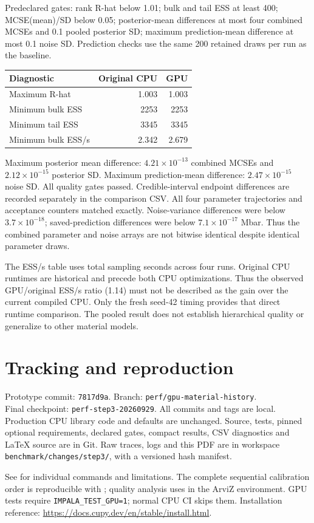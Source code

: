 \documentclass[11pt]{article}
\begin{document}
Predeclared gates: rank R-hat below 1.01; bulk and tail ESS at least 400;
MCSE(mean)/SD below 0.05; posterior-mean differences at most four combined MCSEs
and 0.1 pooled posterior SD; maximum prediction-mean difference at most 0.1 noise
SD. Prediction checks use the same 200 retained draws per run as the baseline.
\begin{center}\begin{tabular}{lrr}\toprule
Diagnostic & Original CPU & GPU\\\midrule
Maximum R-hat & 1.003 & 1.003\\
Minimum bulk ESS & 2253 & 2253\\
Minimum tail ESS & 3345 & 3345\\
Minimum bulk ESS/s & 2.342 & 2.679\\
\bottomrule\end{tabular}\end{center}
Maximum posterior mean difference: $4.21\times10^{-13}$ combined MCSEs
and $2.12\times10^{-15}$ posterior SD. Maximum prediction-mean difference:
$2.47\times10^{-15}$ noise SD. All quality gates passed. Credible-interval
endpoint differences are recorded separately in the comparison CSV.
All four parameter trajectories and acceptance counters matched exactly.
Noise-variance differences were below $3.7\times10^{-18}$; saved-prediction
differences were below $7.1\times10^{-17}$ Mbar. Thus the combined parameter
and noise arrays are not bitwise identical despite identical parameter draws.

The ESS/s table uses total sampling seconds across four runs. Original CPU
runtimes are historical and precede both CPU optimizations. Thus the observed
GPU/original ESS/s ratio (1.14) must not be described as the gain over
the current compiled CPU. Only the fresh seed-42 timing provides that direct
runtime comparison. The pooled result does not establish hierarchical quality
or generalize to other material models.
\section*{Tracking and reproduction}
Prototype commit: \texttt{7817d9a}. Branch: \texttt{perf/gpu-material-history}.\\
Final checkpoint: \texttt{perf-step3-20260929}. All commits and tags are local.
Production CPU library code and defaults are unchanged. Source, tests, pinned
optional requirements, declared gates, compact results, CSV diagnostics and
LaTeX source are in Git. Raw traces, logs and this PDF are in workspace
\texttt{benchmark/changes/step3/}, with a versioned hash manifest.

See  for individual commands and limitations.
The complete sequential calibration order is reproducible with
; quality analysis uses
 in the ArviZ environment. GPU tests require
\texttt{IMPALA\_TEST\_GPU=1}; normal CPU CI skips them. Installation reference:
\url{https://docs.cupy.dev/en/stable/install.html}.
\end{document}
